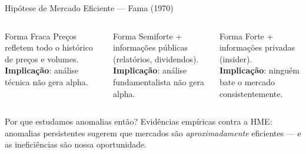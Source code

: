 \documentclass[aspectratio=169,12pt]{beamer}
\begin{document}
\begin{frame}[fragile]{Hipótese de Mercado Eficiente — Fama (1970)}

\begin{columns}[T]
  \begin{block}{Forma Fraca}
    Preços refletem todo o histórico de preços e volumes.\\[.3em]
    \textbf{Implicação}: análise técnica não gera alpha.
  \end{block}
  \begin{block}{Forma Semiforte}
    + informações públicas (relatórios, dividendos).\\[.3em]
    \textbf{Implicação}: análise fundamentalista não gera alpha.
  \end{block}
  \begin{alertblock}{Forma Forte}
    + informações privadas (insider).\\[.3em]
    \textbf{Implicação}: ninguém bate o mercado consistentemente.
  \end{alertblock}
\end{columns}
\vspace{.4em}
\begin{exampleblock}{Por que estudamos anomalias então?}
  Evidências empíricas contra a HME: anomalias persistentes sugerem que mercados são
  \textit{aproximadamente} eficientes — e as ineficiências são nossa oportunidade.
\end{exampleblock}
\end{frame}
\end{document}
